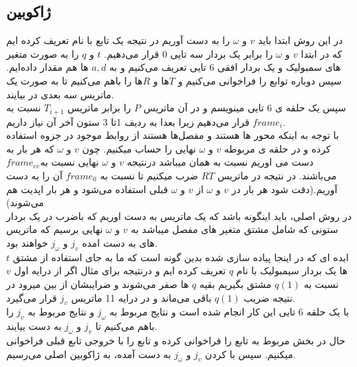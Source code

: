 \documentclass{article}
\begin{document}
\subsection{ژاکوبین }
در این روش ابتدا باید $v$ و $\omega$ را به دست آوریم در نتیجه یک تابع با نام  تعریف کرده ایم که در ابتدا $v$ و $\omega$ را برابر یک بردار سه تایی 0 قرار می‌دهیم. $t$ و $q$ را به صورت متغیر های سمبولیک و یک بردار افقی 6 تایی تعریف می‌کنیم و به $a, d$ ها هم مقدار داده‌ایم.
سپس دوباره توابع  را فراخوانی می‌کنیم و $T$ها و $R$ها را باهم  می‌کنیم تا به صورت یک ماتریس سه بعدی در بیایند.
\\
سپس یک حلقه ی 6 تایی مینویسم و در آن ماتریس $P$ را برابر ماتریس $T_{i+1}$ نسبت به $frame_{i}$ قرار می‌دهیم زیرا بعدا به ردیف 1تا 3  ستون آخر آن نیاز داریم.
\\
با توجه به اینکه محور ها  هستند و مفصل‌ها  هستند از روابط موجود در جزوه استفاده کرده و در حلقه ی  مربوطه $v$ و $\omega$  نهایی را حساب میکنیم. چون $v$ و $\omega$ که هر بار به دست می اوریم نسبت به همان  میباشد درنتیجه $v$ و $\omega$ نهایی نسبت به$ frame_{ee}$ می‌باشند. در نتیجه در ماتریس $RT$ ضرب میکنیم تا نسبت به $frame_{0}$ آن را به دست آوریم.(دقت شود هر بار در $v$ و $\omega$ از $v$ و $\omega$ قبلی استفاده می‌شود و هر بار اپدیت هم می‌شوند)
\\
در روش اصلی، باید اینگونه باشد که یک ماتریس به دست اوریم که باضرب در یک بردار ستونی که شامل مشتق متغیر های مفصل میباشد به $v$ و $\omega$ نهایی برسیم که ماتریس های به دست امده $j_{v}$ و $j_{\omega}$  خواهند بود.
\\
ایده ای که در اینجا پیاده سازی شده بدین گونه است که ما به جای استفاده از  مشتق $t$ ها یک بردار سیمبولیک با نام $q$ تعریف کرده ایم  و درنتیجه برای مثال اگر از درایه اول $v$ نسبت به $q(1)$ مشتق بگیریم بقیه $q$ ها صفر می‌شوند و ضرایبشان از بین میرود در نتیجه ضریب $q(1)$ باقی می‌ماند و در درایه 11 ماتریس $j_{v}$ قرار می‌گیرد.
\\
با یک حلقه 6 تایی این کار انجام شده است و نتایج مربوط به $j_{\omega}$  و نتایج مربوط به $j_{v}$ را باهم    می‌کنیم تا $j_{v}$ و $j_{\omega}$ به دست بیایند.
\\
حال در بخش مربوط به   تابع  را فراخوانی کرده و تابع   را با خروجی تابع قبلی فراخوانی میکنیم.
سپس با  کردن $j_{v}$ و $j_{\omega}$ به دست آمده، به ژاکوبین اصلی می‌رسیم.
\end{document}
